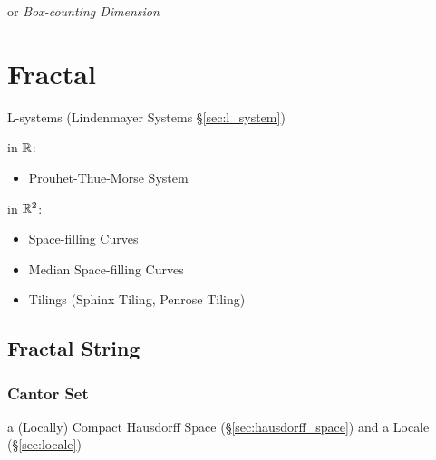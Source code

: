 or \emph{Box-counting Dimension}



\section{Fractal}\label{sec:fractal}

\asterism

L-systems (Lindenmayer Systems \S\ref{sec:l_system})


in $\mathbb{R}$:
\begin{itemize}
  \item Prouhet-Thue-Morse System
\end{itemize}

in $\mathbb{R}^2$:
\begin{itemize}
  \item Space-filling Curves
  \item Median Space-filling Curves
  \item Tilings (Sphinx Tiling, Penrose Tiling)
\end{itemize}



\subsection{Fractal String}\label{sec:fractal_string}

\subsubsection{Cantor Set}\label{sec:cantor_set}

a (Locally) Compact Hausdorff Space (\S\ref{sec:hausdorff_space}) and a Locale
(\S\ref{sec:locale})
